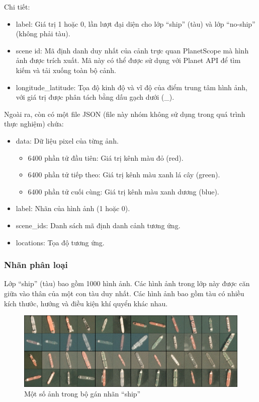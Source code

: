 \documentclass[a4paper,12pt]{article}
\begin{document}
\noindent Chi tiết:
\begin{itemize}
    \item label: Giá trị 1 hoặc 0, lần lượt đại diện cho lớp ``ship'' (tàu) và lớp ``no-ship'' (không phải tàu).
    \item scene id: Mã định danh duy nhất của cảnh trực quan PlanetScope mà hình ảnh được trích xuất. Mã này có thể được sử dụng với Planet API để tìm kiếm và tải xuống toàn bộ cảnh.
    \item longitude\_latitude: Tọa độ kinh độ và vĩ độ của điểm trung tâm hình ảnh, với giá trị được phân tách bằng dấu gạch dưới (\_).
\end{itemize}
\newpage
Ngoài ra, còn có một file JSON (file này nhóm không sử dụng trong quá trình thực nghiệm) chứa:
\begin{itemize}
    \item data: Dữ liệu pixel của từng ảnh.
    \begin{itemize}
        \item  6400 phần tử đầu tiên: Giá trị kênh màu đỏ (red).
        \item 6400 phần tử tiếp theo: Giá trị kênh màu xanh lá cây (green).
        \item 6400 phần tử cuối cùng: Giá trị kênh màu xanh dương (blue).
    \end{itemize}
    \item label: Nhãn của hình ảnh (1 hoặc 0).
    \item scene\_ids: Danh sách mã định danh cảnh tương ứng.
    \item locations: Tọa độ tương ứng.
\end{itemize}
\subsubsection{Nhãn phân loại}
Lớp ``ship'' (tàu) bao gồm 1000 hình ảnh. Các hình ảnh trong lớp này được căn giữa vào thân của một con tàu duy nhất. Các hình ảnh bao gồm tàu có nhiều kích thước, hướng và điều kiện khí quyển khác nhau.
\begin{figure}[H]
\centering
\includegraphics[width=15cm]{ship_image.png}
\caption{Một số ảnh trong bộ gán nhãn ``ship''}
\end{figure}
\end{document}
